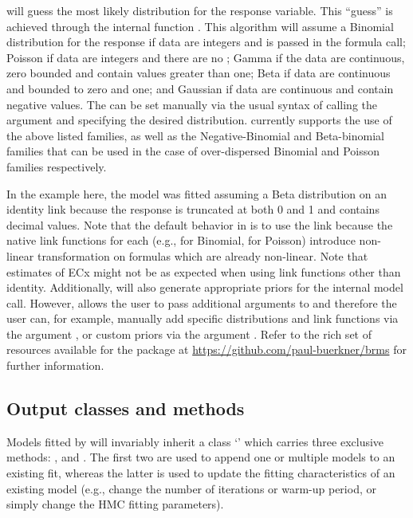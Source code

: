 \documentclass[
  shortnames]{jss}
\newcommand{\cls}[1]{`\code{#1}'}
\begin{document}
 will guess the most likely distribution for the response variable. This ``guess'' is achieved through the internal function . This algorithm will assume a Binomial distribution for the response if data are integers and  is passed in the formula call; Poisson if data are integers and there are no ; Gamma if the data are continuous, zero bounded and contain values greater than one; Beta if data are continuous and bounded to zero and one; and Gaussian if data are continuous and contain negative values. The  can be set manually via the usual  syntax of calling the argument  and specifying the desired distribution.  currently supports the use of the above listed families, as well as the Negative-Binomial and Beta-binomial families that can be used in the case of over-dispersed Binomial and Poisson families respectively.

In the example here, the model was fitted assuming a Beta distribution on an identity link because the response is truncated at both 0 and 1 and contains decimal values. Note that the default behavior in  is to use the  link because the native link functions for each  (e.g.,  for Binomial,  for Poisson) introduce non-linear transformation on formulas which are already non-linear. Note that estimates of ECx might not be as expected when using link functions other than identity. Additionally,  will also generate appropriate priors for the internal  model call. However,  allows the user to pass additional arguments to  and therefore the user can, for example, manually add specific distributions and link functions via the argument , or custom priors via the argument . Refer to the rich set of resources available for the  package at \url{https://github.com/paul-buerkner/brms} for further information.

\hypertarget{output-classes-and-methods}{%
\subsection{Output classes and methods}\label{output-classes-and-methods}}

Models fitted by  will invariably inherit a class \cls{bnecfit} which carries three exclusive methods: \code{\textasciigrave+\textasciigrave()},  and . The first two are used to append one or multiple models to an existing fit, whereas the latter is used to update the fitting characteristics of an existing model (e.g., change the number of iterations or warm-up period, or simply change the HMC fitting parameters).
\end{document}
